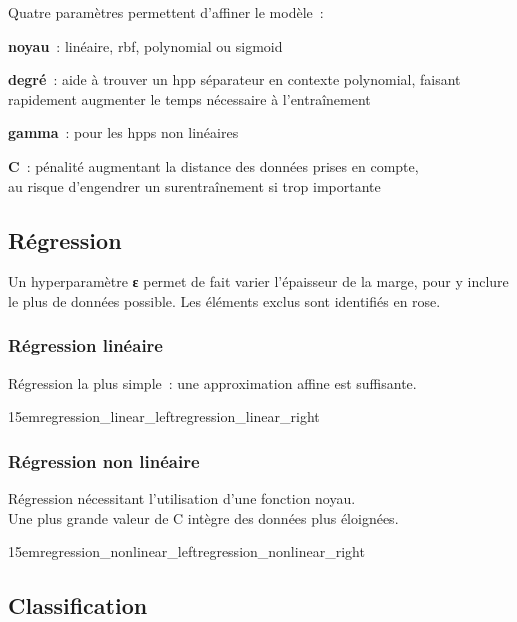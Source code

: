 Quatre paramètres permettent d’affiner le modèle :
\begin{itmz}
\item{\textbf{noyau} : linéaire, \gls{rbf}, polynomial ou \gls{sigmoid}}
\item{\textbf{degré} : aide à trouver un \gls{hpp} séparateur en contexte polynomial,
faisant rapidement augmenter le temps nécessaire à l’entraînement}
\item{\textbf{gamma} : pour les \glspl{hpp} non linéaires}
\item{\textbf{C} : pénalité augmentant la distance des données prises en compte,\\
au risque d’engendrer un surentraînement si trop importante}
\end{itmz}

\pagebreak

\subsection{Régression}

Un hyperparamètre \textbf{ε} permet de fait varier l’épaisseur de la marge,
pour y inclure le plus de données possible.
Les éléments exclus sont identifiés en rose.

\subsubsection{Régression linéaire}

Régression la plus simple : une approximation affine est suffisante.

{15em}{regression_linear_left}{regression_linear_right}

\subsubsection{Régression non linéaire}

Régression nécessitant l’utilisation d’une fonction noyau.\\
Une plus grande valeur de C intègre des données plus éloignées.

{15em}{regression_nonlinear_left}{regression_nonlinear_right}

\pagebreak

\subsection{Classification}

